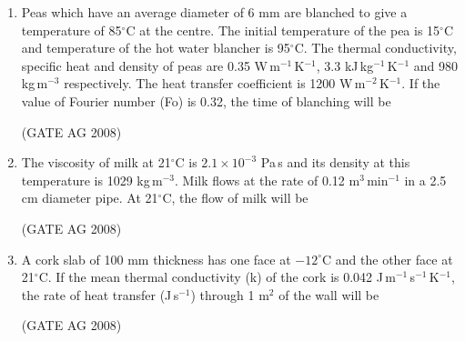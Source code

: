 \documentclass[journal,12pt,onecolumn]{IEEEtran}
\begin{document}
\begin{enumerate}
\medskip


\item 
 Peas which have an average diameter of 6 mm are blanched to give a temperature of 85${}^\circ$C at the centre. The initial temperature of the pea is 15${}^\circ$C and temperature of the hot water blancher is 95${}^\circ$C. The thermal conductivity, specific heat and density of peas are 0.35 W\,m$^{-1}$\,K$^{-1}$, 3.3 kJ\,kg$^{-1}$\,K$^{-1}$ and 980 kg\,m$^{-3}$ respectively. The heat transfer coefficient is 1200 W\,m$^{-2}$\,K$^{-1}$. If the value of Fourier number (Fo) is 0.32, the time of blanching will be
\begin{enumerate}
\end{enumerate}
\hfill(GATE AG 2008)\\

\medskip

\item 
 The viscosity of milk at 21${}^\circ$C is $2.1 \times 10^{-3}$ Pa\,s and its density at this temperature is 1029 kg\,m$^{-3}$. Milk flows at the rate of 0.12 m$^3$\,min$^{-1}$ in a 2.5 cm diameter pipe. At 21${}^\circ$C, the flow of milk will be
\begin{enumerate}
\end{enumerate}
\hfill(GATE AG 2008)\\

\medskip

\item 
 A cork slab of 100 mm thickness has one face at $-12^\circ$C and the other face at 21${}^\circ$C. If the mean thermal conductivity (k) of the cork is 0.042 J\,m$^{-1}$\,s$^{-1}$\,K$^{-1}$, the rate of heat transfer (J\,s$^{-1}$) through 1 m$^2$ of the wall will be
\begin{enumerate}
\end{enumerate}
\hfill(GATE AG 2008)\\


\end{enumerate}
\end{document}
